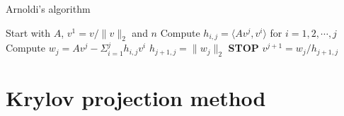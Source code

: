 \begin{algorithm} 
\begin{algorithmic} \caption{Arnoldi's algorithm\cite{arnold}} \label{alg:arnoldi}  
\STATE Start with $A$, $v^1 = v/\|v \|_2$ and $n$
   \STATE Compute $h_{i,j} = \langle Av^j,v^i \rangle $ for $i = 1,2,\cdots, j$
    \STATE Compute $w_j = A v^j - \Sigma_{i=1}^{j} h_{i,j}v^i $
    \STATE $h_{j+1,j} = \| w_j \|_2$
        \STATE\textbf{STOP}
    \ENDIF 
   \STATE $v^{j+1} = w_j/h_{j+1,j}$
\ENDFOR
\end{algorithmic} 
\end{algorithm}
\section{Krylov projection method} \label{sec:fullKPM}

